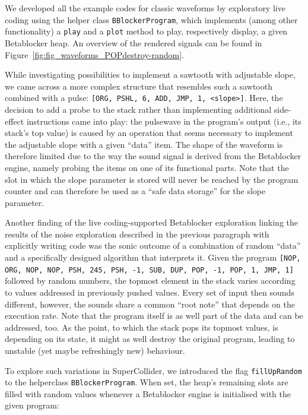 \documentclass[letterpaper, 12pt]{article}
\begin{document}
We developed all the example codes for classic waveforms by exploratory live coding using the helper class \texttt{BBlockerProgram}, which implements (among other functionality) a \texttt{play} and a \texttt{plot} method to play, respectively display, a given Betablocker heap.
An overview of the rendered signals can be found in Figure~\ref{fig:fig_waveforms_POPdestroy-random}.


While investigating possibilities to implement a sawtooth with adjustable slope, we came across a more complex structure that resembles such a sawtooth combined with a pulse: \texttt{[ORG, PSHL, 6, ADD, JMP, 1, <slope>]}.
Here, the decision to add a probe to the stack rather than implementing additional side-effect instructions came into play: the pulsewave in the program's output (i.e., its stack's top value) is caused by an operation that seems necessary to implement the adjustable slope with a given ``data'' item.
The shape of the waveform is therefore limited due to the way the sound signal is derived from the Betablocker engine, namely probing the items on one of its functional parts.
Note that the slot in which the slope parameter is stored will never be reached by the program counter and can therefore be used as a ``safe data storage'' for the slope parameter.


Another finding of the live coding-supported Betablocker exploration linking the results of the noise exploration described in the previous paragraph with explicitly writing code was the sonic outcome of a combination of random ``data'' and a specifically designed algorithm that interprets it.
Given the program
\texttt{[NOP, ORG, NOP, NOP, PSH, 245, PSH, -1, SUB, DUP, POP, -1, POP, 1, JMP, 1]}
followed by random numbers, the topmost element in the stack varies according to values addressed in previously pushed values.
Every set of input then sounds different, however, the sounds share a common ``root note'' that depends on the execution rate.
Note that the program itself is as well part of the data and can be addressed, too.
As the point, to which the stack pops its topmost values, is depending on its state, it might as well destroy the original program, leading to unstable (yet maybe refreshingly new) behaviour.

To explore such variations in SuperCollider, we introduced the flag \texttt{fillUpRandom} to the helperclass \texttt{BBlockerProgram}.
When set, the heap's remaining slots are filled with random values whenever a Betablocker engine is initialised with the given program:
\end{document}
